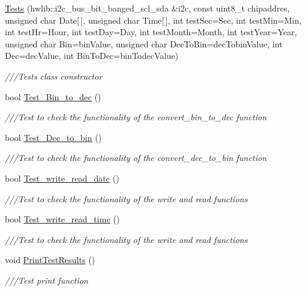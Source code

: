 \begin{DoxyCompactItemize}
\item 
\hyperlink{classTests_afc34127a38f4366f6a014ae65e10ee57}{Tests} (hwlib\+::i2c\+\_\+bus\+\_\+bit\+\_\+banged\+\_\+scl\+\_\+sda \&i2c, const uint8\+\_\+t chipaddres, unsigned char Date\mbox{[}$\,$\mbox{]}, unsigned char Time\mbox{[}$\,$\mbox{]}, int test\+Sec=Sec, int test\+Min=Min, int test\+Hr=Hour, int test\+Day=Day, int test\+Month=Month, int test\+Year=Year, unsigned char Bin=bin\+Value, unsigned char Dec\+To\+Bin=dec\+Tobin\+Value, int Dec=dec\+Value, int Bin\+To\+Dec=bin\+Todec\+Value)
\begin{DoxyCompactList}\small\item\em ///\+Tests class constructor \end{DoxyCompactList}\item 
bool \hyperlink{classTests_a248d3e358bc39ec091db2e5a7f6ddd6f}{Test\+\_\+\+Bin\+\_\+to\+\_\+dec} ()
\begin{DoxyCompactList}\small\item\em ///\+Test to check the functionality of the convert\+\_\+bin\+\_\+to\+\_\+dec function \end{DoxyCompactList}\item 
bool \hyperlink{classTests_af1957c73de97f80003a4352e499b04c1}{Test\+\_\+\+Dec\+\_\+to\+\_\+bin} ()
\begin{DoxyCompactList}\small\item\em ///\+Test to check the functionality of the convert\+\_\+dec\+\_\+to\+\_\+bin function \end{DoxyCompactList}\item 
bool \hyperlink{classTests_ab270a477241bfe006f3e1803108c3b16}{Test\+\_\+write\+\_\+read\+\_\+date} ()
\begin{DoxyCompactList}\small\item\em ///\+Test to check the functionality of the write and read functions \end{DoxyCompactList}\item 
bool \hyperlink{classTests_ab5122391e15bf4a8dda6dac97aeb39b2}{Test\+\_\+write\+\_\+read\+\_\+time} ()
\begin{DoxyCompactList}\small\item\em ///\+Test to check the functionality of the write and read functions \end{DoxyCompactList}\item 
void \hyperlink{classTests_ae29be1edf96424ad0f81a15bbf5b983e}{Print\+Test\+Results} ()
\begin{DoxyCompactList}\small\item\em ///\+Test print function \end{DoxyCompactList}\end{DoxyCompactItemize}



